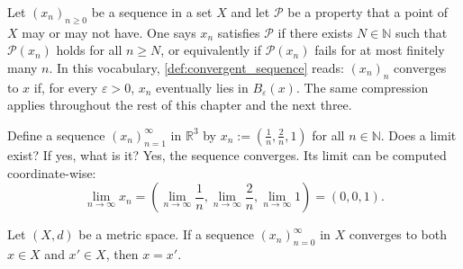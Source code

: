\begin{notation}[\qt{Eventually}]
\label{not:eventually}
Let $(x_n)_{n\geq0}$ be a sequence in a set $X$ and let $\mathcal{P}$ be a property that a point
of $X$ may or may not have. One says $x_n$ satisfies $\mathcal{P}$ 
 if there exists $N \in \mathbb{N}$ such that $\mathcal{P}(x_n)$
holds for all $n \geq N$, or equivalently if $\mathcal{P}(x_n)$ fails for at most finitely many
$n$. In this vocabulary, \cref{def:convergent_sequence} reads: $(x_n)_n$ converges to $x$ if, for
every $\varepsilon>0$, $x_n$ eventually lies in $B_\varepsilon(x)$. The same compression applies
throughout the rest of this chapter and the next three.
\end{notation}

\begin{example}
\label{ex:convergent_sequence_R3}
Define a sequence $(x_n)_{n=1}^{\infty}$ in $\mathbb{R}^3$ by $x_n := \left(\frac{1}{n}, \frac{2}{n}, 1\right)$ for all $n \in \mathbb{N}$. Does a limit exist? If yes, what is it?
Yes, the sequence converges. Its limit can be computed coordinate-wise:
\[
\lim_{n\to\infty} x_n = \left(\lim_{n\to\infty} \frac{1}{n}, \lim_{n\to\infty} \frac{2}{n}, \lim_{n\to\infty} 1\right) = (0,0,1).
\]
\end{example}

\begin{proposition}
\label{prop:uniqueness_of_limits}
Let $(X,d)$ be a metric space. If a sequence $(x_n)_{n=0}^{\infty}$ in $X$ converges to both
$x \in X$ and $x' \in X$, then $x = x'$.
\end{proposition}

